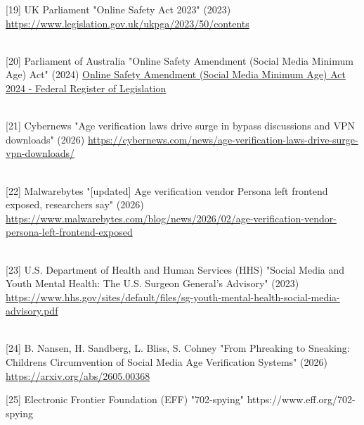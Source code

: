 \documentclass[
]{article}
\begin{document}
{[}19{]} UK Parliament "Online Safety Act 2023" (2023)
\url{https://www.legislation.gov.uk/ukpga/2023/50/contents}\\
\strut \\
{[}20{]} Parliament of Australia "Online Safety Amendment (Social Media
Minimum Age) Act" (2024)
\href{https://www.legislation.gov.au/C2024A00127/asmade/text}{Online
Safety Amendment (Social Media Minimum Age) Act 2024 - Federal Register
of Legislation}\\
\strut \\
{[}21{]} Cybernews "Age verification laws drive surge in bypass
discussions and VPN downloads" (2026)
\href{https://www.google.com/search?q=https://cybernews.com/news/age-verification-laws-drive-surge-vpn-downloads/\&authuser=1}{https://cybernews.com/news/age-verification-laws-drive-surge-vpn-downloads/}\\
\strut \\
{[}22{]} Malwarebytes "{[}updated{]} Age verification vendor Persona
left frontend exposed, researchers say" (2026)
\url{https://www.malwarebytes.com/blog/news/2026/02/age-verification-vendor-persona-left-frontend-exposed}\\
\strut \\
{[}23{]} U.S. Department of Health and Human Services (HHS) "Social
Media and Youth Mental Health: The U.S. Surgeon General's Advisory"
(2023)
\url{https://www.hhs.gov/sites/default/files/sg-youth-mental-health-social-media-advisory.pdf}\\
\strut \\
{[}24{]} B. Nansen, H. Sandberg, L. Bliss, S. Cohney "From Phreaking to
Sneaking: Children\textquotesingle s Circumvention of Social Media Age
Verification Systems" (2026) \url{https://arxiv.org/abs/2605.00368}

{[}25{]} Electronic Frontier Foundation (EFF) "702-spying"
https://www.eff.org/702-spying
\end{document}
